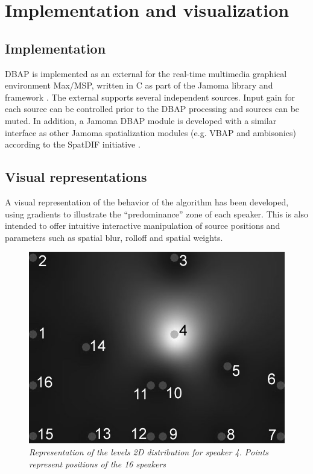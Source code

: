 \documentclass[twoside,10pt]{article}
\begin{document}
\section{Implementation and visualization}

\subsection{Implementation}
\label{sec:implementation}

DBAP is implemented as an external for the real-time multimedia graphical environment Max/MSP, written in C as part of the Jamoma library and framework \cite{Place:2006jamoma}. The external supports several independent sources. Input gain for each source can be controlled prior to the DBAP processing and sources can be muted.  In addition, a Jamoma DBAP module is developed with a similar interface as other Jamoma spatialization modules (e.g. VBAP and ambisonics) according to the SpatDIF initiative \cite{Peters:2008spatdif}.



\subsection{Visual representations}
\label{sec:visual_representation}


A visual representation of the behavior of the algorithm has been developed, using gradients to illustrate the ``predominance'' zone of each speaker. This is also intended to offer intuitive interactive manipulation of source positions and parameters such as spatial blur, rolloff and spatial weights.

\begin{figure}[ht]
\centerline{\includegraphics[scale=0.5]{spk4_r_6_b_0+nbrs}}
\caption{{\it Representation of the levels 2D distribution for speaker 4. %
Points represent positions of the 16 speakers}}  
\label{fig:1spk}
\end{figure}
\end{document}
